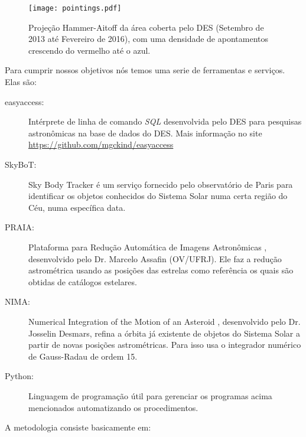 \documentclass[a4paper, 11pt]{article}
\begin{document}
\begin{figure}[H]
\centering \texttt{[image: pointings.pdf]}
\caption{Proje\c{c}\~ao Hammer-Aitoff da \'area coberta pelo DES (Setembro de 2013 at\'e Fevereiro de 2016), com uma densidade de apontamentos crescendo do
vermelho at\'e o azul.}
\label{fig:cobertura}
\end{figure}


Para cumprir nossos objetivos n\'os temos uma serie de ferramentas e servi\c{c}os. Elas s\~ao:

\begin{description}
\item[easyaccess:] Int\'erprete de linha de comando \textit{SQL} desenvolvida pelo DES para pesquisas astron\^omicas na base de dados do DES. Mais informa\c{c}\~ao no site \url{https://github.com/mgckind/easyaccess}
\item[SkyBoT:] Sky Body Tracker \citep{2006ASPC..351..367B} \'e um servi\c{c}o fornecido pelo observat\'orio de Paris para identificar os objetos conhecidos do Sistema Solar numa certa regi\~ao do C\'eu, numa espec\'ifica data.
\item[PRAIA:] Plataforma para Redu\c{c}\~ao Autom\'atica de Imagens Astron\^omicas \citep{2011gfun.conf...85A}, desenvolvido pelo Dr. Marcelo Assafin (OV/UFRJ). Ele faz a redu\c{c}\~ao astrométrica usando as posi\c{c}\~oes das estrelas como refer\^encia os quais s\~ao obtidas de cat\'alogos estelares.
\item[NIMA:] Numerical Integration of the Motion of an Asteroid \citep{2015A&A...584A..96D}, desenvolvido pelo Dr. Josselin Desmars, refina a \'orbita j\'a existente de objetos do Sistema Solar a partir de novas posi\c{c}\~oes astrom\'etricas. Para isso usa o integrador num\'erico de Gauss-Radau de ordem 15.
\item[Python:] Linguagem de programa\c{c}\~ao \'util para gerenciar os programas acima mencionados automatizando os procedimentos. 
\end{description}

A metodologia consiste basicamente em:
\end{document}
